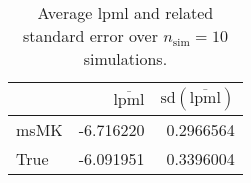 \begin{table}[H]

\caption{Average lpml and related standard error over $n_{\text{sim}} = 10$ simulations.}
\centering
\begin{tabular}[t]{lrr}
\toprule
  & $\overbar{\text{lpml}}$ & $\text{sd}(\overbar{\text{lpml}})$\\
\midrule
msMK & -6.716220 & 0.2966564\\
True & -6.091951 & 0.3396004\\
\bottomrule
\end{tabular}
\end{table}